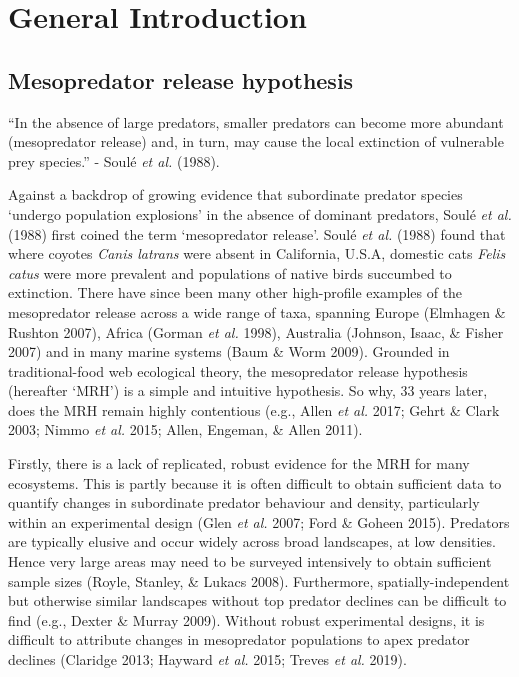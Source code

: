 \documentclass[11pt,a4paper,titlepage,twoside,openright]{style/unimelbthesis}
\begin{document}
\begin{mainmatter}

\hypertarget{general-introduction}{%
\chapter{General Introduction}\label{general-introduction}}

\hypertarget{mesopredator-release-hypothesis}{%
\section{Mesopredator release hypothesis}\label{mesopredator-release-hypothesis}}

``In the absence of large predators, smaller predators can become more abundant (mesopredator release) and, in turn, may cause the local extinction of vulnerable prey species.'' - Soulé \emph{et al.} (1988).

Against a backdrop of growing evidence that subordinate predator species `undergo population explosions' in the absence of dominant predators, Soulé \emph{et al.} (1988) first coined the term `mesopredator release'. Soulé \emph{et al.} (1988) found that where coyotes \emph{Canis latrans} were absent in California, U.S.A, domestic cats \emph{Felis catus} were more prevalent and populations of native birds succumbed to extinction. There have since been many other high-profile examples of the mesopredator release across a wide range of taxa, spanning Europe (Elmhagen \& Rushton 2007), Africa (Gorman \emph{et al.} 1998), Australia (Johnson, Isaac, \& Fisher 2007) and in many marine systems (Baum \& Worm 2009). Grounded in traditional-food web ecological theory, the mesopredator release hypothesis (hereafter `MRH') is a simple and intuitive hypothesis. So why, 33 years later, does the MRH remain highly contentious (e.g., Allen \emph{et al.} 2017; Gehrt \& Clark 2003; Nimmo \emph{et al.} 2015; Allen, Engeman, \& Allen 2011).

Firstly, there is a lack of replicated, robust evidence for the MRH for many ecosystems. This is partly because it is often difficult to obtain sufficient data to quantify changes in subordinate predator behaviour and density, particularly within an experimental design (Glen \emph{et al.} 2007; Ford \& Goheen 2015). Predators are typically elusive and occur widely across broad landscapes, at low densities. Hence very large areas may need to be surveyed intensively to obtain sufficient sample sizes (Royle, Stanley, \& Lukacs 2008). Furthermore, spatially-independent but otherwise similar landscapes without top predator declines can be difficult to find (e.g., Dexter \& Murray 2009). Without robust experimental designs, it is difficult to attribute changes in mesopredator populations to apex predator declines (Claridge 2013; Hayward \emph{et al.} 2015; Treves \emph{et al.} 2019).


\end{mainmatter}
\end{document}

